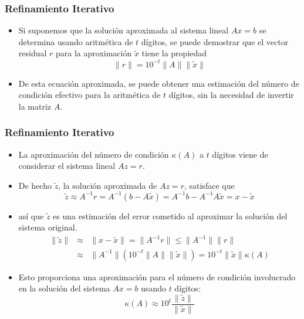 \documentclass[10pt]{beamer}
\begin{document}
  \begin{frame}
    \frametitle{Refinamiento Iterativo}
    \begin{itemize}
      \item Si suponemos que la soluci\'on aproximada al sistema lineal $A x = b$ se determina usando aritm\'etica de $t$ d\'igitos, se puede demostrar que el vector residual $r$ para la aproximaci\'on $\tilde x$ tiene la propiedad
      $$
       \|r\| = 10^{-t}\|A\|\|\tilde x\|
      $$
      \item<2-> De esta ecuaci\'on aproximada, se puede obtener una estimaci\'on del n\'umero de condici\'on efectivo para la aritm\'etica de $t$ d\'igitos, sin la necesidad de invertir la matriz $A$.
    \end{itemize}
  \end{frame}
  \begin{frame}
    \frametitle{Refinamiento Iterativo}
    \begin{itemize}
      \item La aproximaci\'on del n\'umero de condici\'on $\kappa(A)$ a $t$ d\'igitos viene de considerar el sistema lineal $A z = r$.
      \item<2-> De hecho $\tilde z$, la soluci\'on aproximada de $A z = r$, satisface que      
      $$
       \tilde z \approx A^{-1}r = A^{-1}(b-A\tilde x) = A^{-1}b - A^{-1}A\tilde x = x - \tilde x
      $$
      \item<3-> as\'i que $\tilde z$ es una estimaci\'on del error cometido al aproximar la soluci\'on del sistema original.      
      \begin{eqnarray}
       \nonumber \|\tilde z\| & \approx & \|x-\tilde x\|=\|A^{-1}r\| \leq \|A^{-1}\|\|r\|\\
       \nonumber & \approx & \|A^{-1}\|\left(10^{-t}\|A\|\|\tilde x\|\right) = 10^{-t}\|\tilde x\|\kappa(A)
      \end{eqnarray}
      \item<4-> Esto proporciona una aproximaci\'on para el n\'umero de condici\'on involucrado en la soluci\'on del sistema $A x = b$ usando $t$ d\'igitos:
      $$
       \kappa(A) \approx 10^t\frac{\|\tilde z\|}{\|\tilde x\|}
      $$      
    \end{itemize}
  \end{frame}      
\end{document}
